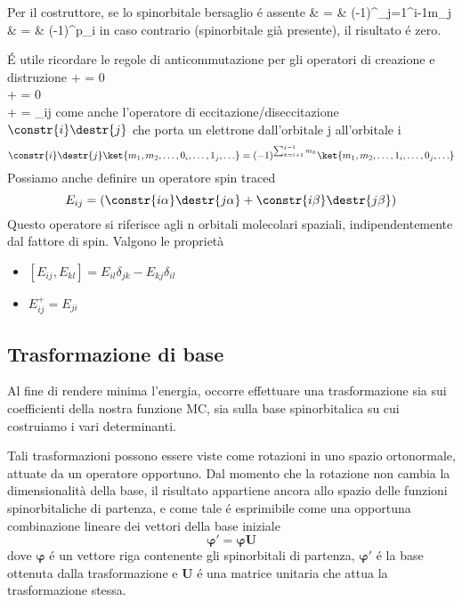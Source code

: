Per il costruttore, se lo spinorbitale bersaglio \'e assente
\beqas
{}  & = &
(-1)^{\sum_{j=1}^{i-1}m_j}  \\
  & = &
(-1)^{p_i}
\eeqas
in caso contrario (spinorbitale gi\`a presente), il risultato \'e zero.

\'E utile ricordare le regole di anticommutazione per gli operatori di
creazione e distruzione
\beqas
{}+ = 0 \\
+ = 0 \\
+ = \delta_{ij}
\eeqas
come anche l'operatore di eccitazione/diseccitazione $\constr{i}\destr{j}$ che porta un
elettrone dall'orbitale j all'orbitale i
$$
\constr{i}\destr{j} \ket{m_1,m_2,\ldots,0_i,\ldots,1_j,\ldots} =
(-1)^{\sum_{k=i+1}^{j-1}m_k} \ket{m_1,m_2,\ldots,1_i,\ldots,0_j,\ldots}
$$
Possiamo anche definire un operatore spin traced
$$
E_{ij} = \left( \constr{i\alpha}\destr{j\alpha} +
\constr{i\beta}\destr{j\beta} \right)
$$
Questo operatore si riferisce agli n orbitali molecolari spaziali,
indipendentemente dal fattore di spin.
Valgono le propriet\`a
\begin{itemize}
\item $ \left[ E_{ij}, E_{kl} \right] = E_{il}\delta_{jk} -
E_{kj}\delta_{il} $
\item $ E^{+}_{ij} = E_{ji} $
\end{itemize}


\subsection{Trasformazione di base}

Al fine di rendere minima l'energia, occorre effettuare una trasformazione 
sia sui coefficienti della nostra funzione MC, sia sulla base spinorbitalica 
su cui costruiamo i vari determinanti.

Tali trasformazioni possono essere viste come rotazioni in uno spazio
ortonormale, attuate da un operatore opportuno. Dal momento che la
rotazione non cambia la dimensionalit\`a della base, il risultato
appartiene ancora allo spazio delle funzioni spinorbitaliche di
partenza, e come tale \'e esprimibile come una opportuna combinazione
lineare dei vettori della base iniziale
$$
\mathbf{\varphi}' = \mathbf{\varphi}\mathbf{U}
$$
dove $\mathbf{\varphi}$ \'e un vettore riga contenente gli spinorbitali di
partenza, $\mathbf{\varphi}'$ \'e la base ottenuta dalla trasformazione e
$\mathbf{U}$ \'e una matrice unitaria che attua la trasformazione stessa.

